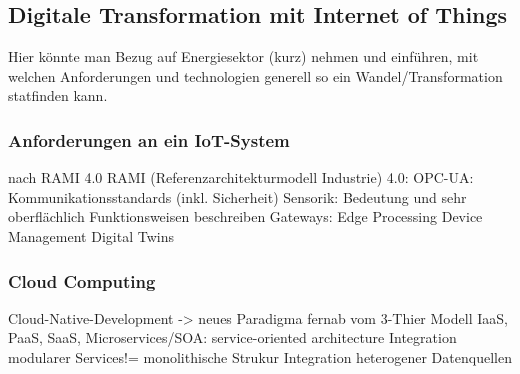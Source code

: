 \subsection{Digitale Transformation mit Internet of Things}
Hier könnte man Bezug auf Energiesektor (kurz) nehmen und einführen, mit welchen Anforderungen und technologien generell so ein Wandel/Transformation statfinden kann.
\subsubsection{Anforderungen an ein IoT-System}
nach RAMI 4.0
RAMI (Referenzarchitekturmodell Industrie) 4.0: OPC-UA: Kommunikationsstandards (inkl. Sicherheit)
Sensorik: Bedeutung und sehr oberflächlich Funktionsweisen beschreiben
Gateways: Edge Processing
Device Management
Digital Twins

\subsubsection{Cloud Computing}
Cloud-Native-Development -> neues Paradigma fernab vom 3-Thier Modell
IaaS, PaaS, SaaS, Microservices/SOA: service-oriented architecture
Integration modularer Services!= monolithische Strukur
Integration heterogener Datenquellen
